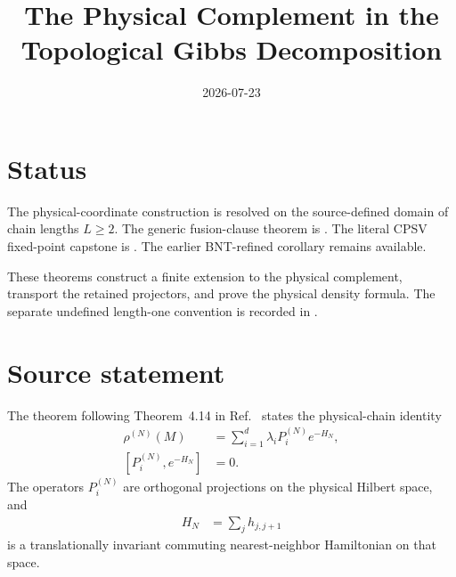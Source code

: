 \documentclass{article}
\title{The Physical Complement in the Topological Gibbs Decomposition}
\author{}
\date{2026-07-23}
\begin{document}
\maketitle
{}

\section{Status}

The physical-coordinate construction is resolved on the source-defined domain
of chain lengths $L\geq2$. The generic fusion-clause theorem is
.
The literal CPSV fixed-point capstone is
.
The earlier BNT-refined corollary
 remains
available.

These theorems construct a finite extension to the physical complement,
transport the retained projectors, and prove the physical density formula. The
separate undefined length-one convention is recorded in
.

\section{Source statement}

The theorem following Theorem~4.14 in
Ref.~\cite[lines~1013--1016]{Cirac2016MPDO_arXiv} states the physical-chain
identity
\begin{align}
    \rho^{(N)}(M)
        &= \sum_{i=1}^{d}\lambda_iP_i^{(N)}e^{-H_N},
    \label{eq:cpsv16_topological_gibbs_physical_complement_source_decomposition}\\
    [P_i^{(N)},e^{-H_N}]
        &= 0.
    \label{eq:cpsv16_topological_gibbs_physical_complement_source_commutation}
\end{align}
The operators $P_i^{(N)}$ are orthogonal projections on the physical Hilbert
space, and
\begin{align}
    H_N
        &= \sum_j h_{j,j+1}
    \label{eq:cpsv16_topological_gibbs_physical_complement_source_hamiltonian}
\end{align}
is a translationally invariant commuting nearest-neighbor Hamiltonian on that
space.
\end{document}
